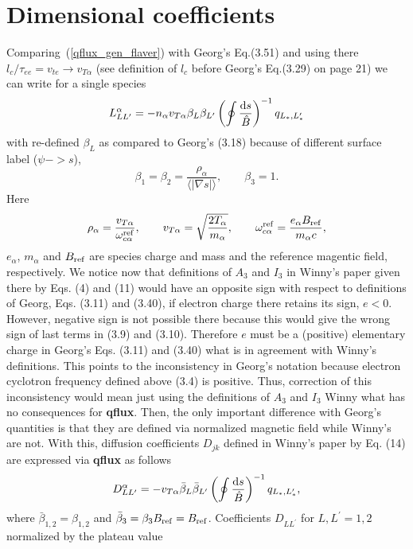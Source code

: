 \documentclass[preprint,prb,aps]{revtex4-1}
\newcommand{\red}[1]{{\color{red} #1}}
\newcommand{\be}[1]{\begin{equation} \label{#1}}
\newcommand{\ee}{\end{equation}}
\newcommand{\eq}[1]{(\ref{#1})}
\newcommand{\rd}{{\rm d}}
\begin{document}
\section{Dimensional coefficients}
Comparing~\eq{qflux_gen_flaver} with Georg's Eq.(3.51) and using there $l_c/\tau_{ee}=v_{te}\rightarrow v_{T\alpha}$
(see definition of $l_c$ before Georg's Eq.(3.29) on page 21) we can write for a single species
\be{Lcoefviaqflux}
L_{LL^\prime}^\alpha=-n_\alpha v_{T\alpha} \beta_L \beta_{L^\prime}
\left(\oint \frac{\rd s}{\hat B}\right)^{-1}
q_{L_\ast,L_\ast^\prime}
\ee
with re-defined $\beta_L$ as compared to Georg's (3.18) because of different surface label ($\psi -> s$),
\be{betas}
\beta_1=\beta_2=\frac{\rho_\alpha}{\langle|\nabla s|\rangle}, \qquad \beta_3=1.
\ee
\red{
Here
\be{vtandrho}
\rho_\alpha = \frac{v_{T\alpha}}{\omega_{c\alpha}^{\rm ref}},
\qquad
v_{T\alpha} = \sqrt{\frac{2 T_\alpha}{m_\alpha}},
\qquad
\omega_{c\alpha}^{\rm ref} = \frac{e_\alpha B_{\rm ref}}{m_\alpha c},
\ee
$e_\alpha$, $m_\alpha$ and $B_{\rm ref}$ are species charge and mass and the reference magentic field, respectively.
}
We notice now that definitions of $A_3$ and $I_3$ in Winny's paper given there by Eqs. (4) and (11)
would have an opposite sign with respect to definitions of Georg, Eqs. (3.11) and (3.40),
if electron charge there retains its sign, $e<0$. However, negative sign is not possible there because
this would give the wrong sign of last terms in (3.9) and (3.10). Therefore $e$ must be a (positive) elementary
charge in Georg's Eqs. (3.11) and (3.40) what is in agreement with Winny's definitions. This points to the
inconsistency in Georg's notation because electron cyclotron frequency defined above (3.4) is positive.
Thus, correction of this inconsistency would mean just using the definitions of $A_3$ and $I_3$ Winny what
has no consequences for {\bf qflux}. Then, the only important difference
with Georg's quantities is that they are defined via normalized magnetic field while Winny's are not.
With this, diffusion coefficients $D_{jk}$ defined in Winny's paper by Eq. (14) are expressed via {\bf qflux} as
follows
\be{difcoefs}
D_{LL^\prime}^\alpha=-v_{T\alpha} \bar\beta_L \bar\beta_{L^\prime}
\left(\oint \frac{\rd s}{\hat B}\right)^{-1}
q_{L_\ast,L_\ast^\prime},
\ee
where $\bar \beta_{1,2}=\beta_{1,2}$ and $\bar \beta_3= \beta_3 B_{\rm ref} = B_{\rm ref}$.
Coefficients $D_{LL^\prime}$ for $L,L^\prime=1,2$ normalized by the plateau value
\end{document}
